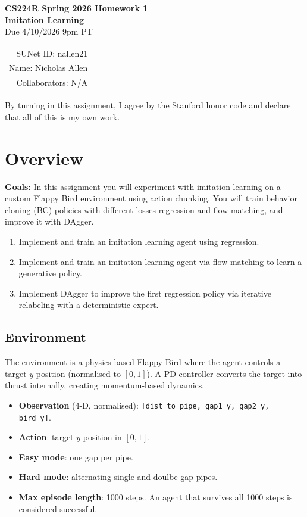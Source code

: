 \documentclass[12pt]{article}
\begin{document}
\begin{center}
{\Large \textbf{CS224R Spring 2026 Homework 1 \\ Imitation Learning}}
\\ {\large Due 4/10/2026 9pm PT}

\begin{tabular}{rl}
SUNet ID: nallen21 & $\hspace{6cm}$\\
Name: Nicholas Allen& \\
Collaborators: N/A& 
\end{tabular}
\end{center}

\noindent By turning in this assignment, I agree by the Stanford honor code and declare
that all of this is my own work. 

\section*{Overview}

\textbf{Goals:} In this assignment you will experiment with imitation learning on a custom Flappy Bird environment using action chunking. You will train behavior cloning (BC) policies with different losses regression and flow matching, and improve it with DAgger.

\begin{enumerate} 
    \item Implement and train an imitation learning agent using regression.
    \item Implement and train an imitation learning agent via flow matching to learn a generative policy.
    \item Implement DAgger to improve the first regression policy via iterative relabeling with a deterministic expert.
\end{enumerate}

\vspace{0.2cm}

\subsection*{Environment}

The environment is a physics-based Flappy Bird where the agent controls a target $y$-position (normalised to $[0, 1]$). A PD controller converts the target into thrust internally, creating momentum-based dynamics.

\begin{itemize}
    \item \textbf{Observation} (4-D, normalised): \texttt{[dist\_to\_pipe, gap1\_y, gap2\_y, bird\_y]}.
    \item \textbf{Action}: target $y$-position in $[0, 1]$.
    \item \textbf{Easy mode}: one gap per pipe.
    \item \textbf{Hard mode}: alternating single and doulbe gap pipes.
    \item \textbf{Max episode length}: 1000 steps. An agent that survives all 1000 steps is considered successful.
\end{itemize}
\end{document}
